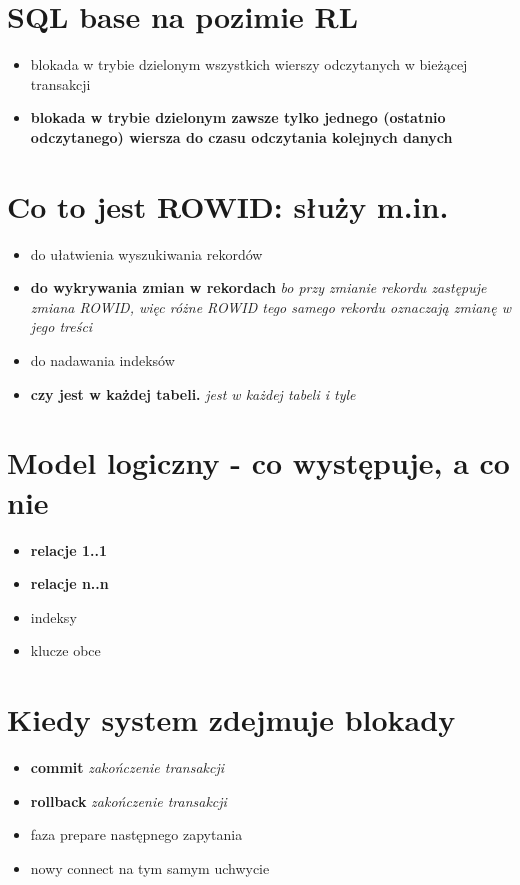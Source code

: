 \documentclass[a4paper,twoside]{article}
\begin{document}
  	\section{SQL base na pozimie RL}
  	\begin{itemize}
  		\item blokada w trybie dzielonym wszystkich wierszy odczytanych w bieżącej transakcji
  		\item \textbf{blokada w trybie dzielonym zawsze tylko jednego (ostatnio odczytanego) wiersza do czasu odczytania kolejnych danych}
  	\end{itemize}
  	
  	\section{Co to jest ROWID: służy m.in.}
  	\begin{itemize}
  		\item do ułatwienia wyszukiwania rekordów
  		\item \textbf{do wykrywania zmian w rekordach} \emph{bo przy zmianie rekordu zastępuje zmiana ROWID, więc różne ROWID tego samego rekordu oznaczają zmianę w jego treści}
  		\item  do nadawania indeksów 
  		\item \textbf{czy jest w każdej tabeli.} \emph{jest w każdej tabeli i tyle}
  	\end{itemize}
  	
  	\section{Model logiczny - co występuje, a co nie}
  	\begin{itemize}
  		\item \textbf{relacje 1..1}
  		\item \textbf{relacje n..n}
  		\item indeksy
  		\item klucze obce
  	\end{itemize}
  	
  	\section{Kiedy system zdejmuje blokady}
  	\begin{itemize}
  		\item \textbf{commit} \emph{zakończenie transakcji}
  		\item \textbf{rollback} \emph{zakończenie transakcji}
  		\item faza prepare następnego zapytania
  		\item nowy connect na tym samym uchwycie
  	\end{itemize}
  	
\end{document}
